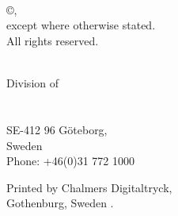 \newpage
\thispagestyle{empty}

\vspace{2cm} \noindent \textbf
\mytitle\\
\ifx\mysubtitle\undefined
\else
  \textit{\small\mysubtitle}
  \\
\fi

\noindent
\textsc{\authorname}\\

\vskip 0.5cm\noindent
\copyright \space \authorname,~\currentyear  \\
\noindent
except where otherwise stated. \\
All rights reserved. \vspace{1cm}


\vfill

\noindent \identifierNoText

\noindent 
\mydepartment\\
Division of \division\\
\ifx\researchgroup\undefined\else\researchgroup\\\fi
\chalIgu\\
SE-412 96 Göteborg,\\
Sweden\\
Phone: +46(0)31 772 1000

\vskip 1.5cm


\noindent
Printed by Chalmers Digitaltryck,\\
Gothenburg, Sweden \currentyear.
